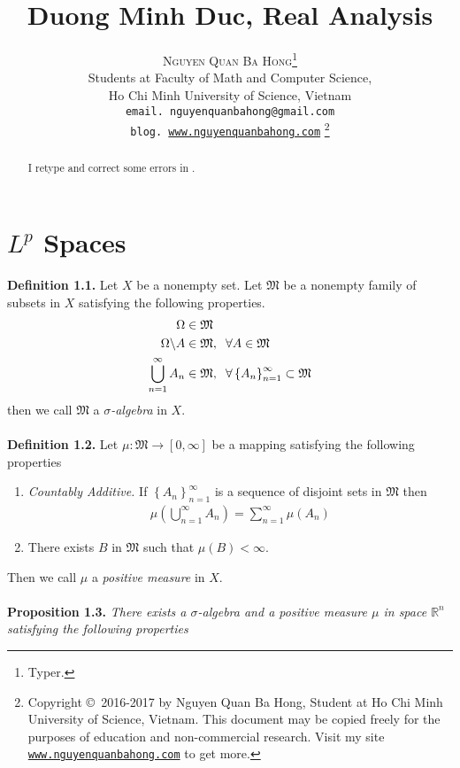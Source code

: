 \documentclass[a4paper]{article}
\title{\Huge Duong Minh Duc, Real Analysis}
\author{\textsc{Nguyen Quan Ba Hong}\footnote{Typer.}\\
{\small Students at Faculty of Math and Computer Science,}\\ 
{\small Ho Chi Minh University of Science, Vietnam} \\
{\small \texttt{email. nguyenquanbahong@gmail.com}}\\
{\small \texttt{blog. \url{www.nguyenquanbahong.com}} 
\footnote{Copyright \copyright\ 2016-2017 by Nguyen Quan Ba Hong, Student at Ho Chi Minh University of Science, Vietnam. This document may be copied freely for the purposes of education and non-commercial research. Visit my site \texttt{\url{www.nguyenquanbahong.com}} to get more.}}}
\numberwithin{equation}{section}
\begin{document}
\maketitle
\begin{abstract}
I retype and correct some errors in \cite{1}.
\end{abstract}
\newpage
\tableofcontents
\newpage
\section{$L^p$ Spaces}
\textbf{Definition 1.1.} Let $X$ be a nonempty set. Let $\mathfrak{M}$ be a nonempty family  of subsets in $X$ satisfying the following properties.
\begin{align}
\Omega  &\in \mathfrak{M}\\
\Omega \backslash A &\in \mathfrak{M},\hspace{0.2cm}\forall A \in \mathfrak{M}\\
\bigcup\limits_{n = 1}^\infty  {{A_n}}  &\in \mathfrak{M},\hspace{0.2cm}\forall \left\{ {{A_n}} \right\}_{n = 1}^\infty  \subset \mathfrak{M}
\end{align}
then we call $\mathfrak{M}$ a \textit{$\sigma$-algebra} in $X$.\\
\\
\textbf{Definition 1.2.} Let $\mu :\mathfrak{M} \to \left[ {0,\infty } \right]$ be a mapping satisfying the following properties
\begin{enumerate}
\item \textit{Countably Additive.} If $\left\{ {{A_n}} \right\}_{n = 1}^\infty $ is a sequence of disjoint sets in $\mathfrak{M}$ then
\begin{align}
\mu \left( {\bigcup\limits_{n = 1}^\infty  {{A_n}} } \right) = \sum\limits_{n = 1}^\infty  {\mu \left( {{A_n}} \right)} 
\end{align}
\item There exists $B$ in $\mathfrak{M}$ such that $\mu \left(B\right) <\infty$.
\end{enumerate}
Then we call $\mu$ a \textit{positive measure} in $X$.\\
\\
\textbf{Proposition 1.3.} \textit{There exists a $\sigma$-algebra and a positive measure $\mu$ in space $\mathbb{R}^n$ satisfying the following properties}
\end{document}
